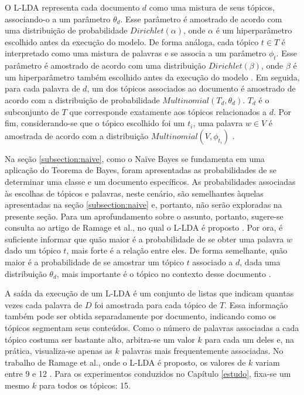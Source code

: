 
O L-LDA representa cada documento \ensuremath{d} como uma mistura de seus tópicos, associando-o a um parâmetro \ensuremath{\theta_d}. Esse parâmetro é amostrado de acordo com uma distribuição de probabilidade \ensuremath{Dirichlet(\alpha)}, onde \ensuremath{\alpha} é um hiperparâmetro escolhido antes da execução do modelo. De forma análoga, cada tópico \ensuremath{t \in T} é interpretado como uma mistura de palavras e se associa a um parâmetro \ensuremath{\phi_t}. Esse parâmetro é amostrado de acordo com uma distribuição \ensuremath{Dirichlet(\beta)}, onde \ensuremath{\beta} é um hiperparâmetro também escolhido antes da execução do modelo \cite{pnas}. Em seguida, para cada palavra de \ensuremath{d}, um dos tópicos associados ao documento é amostrado de acordo com a distribuição de probabilidade \ensuremath{Multinomial(T_d, \theta_d)}. \ensuremath{T_d} é o subconjunto de \ensuremath{T} que corresponde exatamente aos tópicos relacionados a \ensuremath{d}. Por fim, considerando-se que o tópico escolhido foi um \ensuremath{t_i}, uma palavra \ensuremath{w \in V} é amostrada de acordo com a distribuição \ensuremath{Multinomial(V, \phi_{t_i})} \cite{blei}.

Na seção \ref{subsection:naive}, como o Naïve Bayes se fundamenta em uma aplicação do Teorema de Bayes, foram apresentadas as probabilidades de se determinar uma classe e um documento específicos. As probabilidades associadas às escolhas de tópicos e palavras, neste cenário, são semelhantes àquelas apresentadas na seção \ref{subsection:naive} e, portanto, não serão exploradas na presente seção. Para um aprofundamento sobre o assunto, portanto, sugere-se consulta ao artigo de Ramage et al., no qual o L-LDA é proposto \cite{llda}. Por ora, é suficiente informar que quão maior é a probabilidade de se obter uma palavra \ensuremath{w} dado um tópico \ensuremath{t}, mais forte é a relação entre eles. De forma semelhante, quão maior é a probabilidade de se amostrar um tópico \ensuremath{t} associado a \ensuremath{d}, dada uma distribuição \ensuremath{\theta_d}, mais importante é o tópico no contexto desse documento \cite{pnas}.

A saída da execução de um L-LDA é um conjunto de listas que indicam quantas vezes cada palavra de \ensuremath{D} foi amostrada para cada tópico de \ensuremath{T}. Essa informação também pode ser obtida separadamente por documento, indicando como os tópicos segmentam seus conteúdos. Como o número de palavras associadas a cada tópico costuma ser bastante alto, arbitra-se um valor \ensuremath{k} para cada um deles e, na prática, visualiza-se apenas as \ensuremath{k} palavras mais frequentemente associadas. No trabalho de Ramage et al., onde o L-LDA é proposto, os valores de \ensuremath{k} variam entre 9 e 12 \cite{llda}. Para os experimentos conduzidos no Capítulo \ref{estudo}, fixa-se um mesmo \ensuremath{k} para todos os tópicos: 15.  


